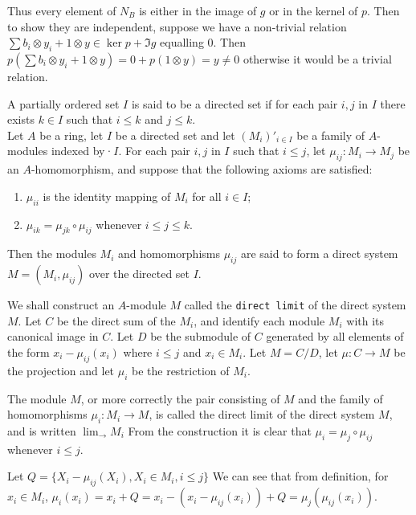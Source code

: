 \documentclass[a4paper]{exam}
\begin{document}
\begin{questions}
\begin{solution}
		Thus every element of $N_B $ is either in the image of $g $ or in the kernel of $p $.
		Then to show they are independent, suppose we have a non-trivial relation $\sum b_i \otimes y_i + 1 \otimes y \in \ker p + \Im g $ equalling 0.
		Then $p(\sum b_i \otimes y_i + 1 \otimes y) = 0 + p(1 \otimes y) = y \ne 0$ otherwise it would be a trivial relation.
	\end{solution}

	\question A partially ordered set $I$ is said to be a directed set if for each pair $i, j$ in $I$ there exists $k \in I$ such that $i\le k $ and $j\le k $.\\
	Let $A$ be a ring, let $I$ be a directed set and let $(M_i)'_{i\in I}$ be a family of $A$-modules indexed by·$I$. For each pair $i,j$ in $I$ such that $i \le j$, let $\mu _{ij}: M_i \to M_j $ be an $A$-homomorphism, and suppose that the following axioms are satisfied:
	\begin{enumerate}
		\item $\mu_{ii} $ is the identity mapping of $M_i$ for all $i\in I $;
		\item $\mu _{ik} = \mu _{jk}\circ \mu _{ij}$ whenever $i\le j \le k $.
	\end{enumerate}
	Then the modules $M_i$ and homomorphisms $\mu_{ij} $ are said to form a direct system $M = (M_i, \mu _{ij})$ over the directed set $I$.

	We shall construct an $A$-module $M$ called the \texttt{direct limit} of the direct system $M$. Let $C$ be the direct sum of the $M_i$, and identify each module $M_i$ with its canonical image in $C$. Let $D$ be the submodule of $C$ generated by all elements of the form $x_i - \mu _{ij}(x_i) $ where $i\le j $ and $x_i\in M_i $. Let $M = C / D $, let $\mu :C\to M $ be the projection and let $\mu _i $ be the restriction of $M_i $.

	The module $M$, or more correctly the pair consisting of $M$ and the family of homomorphisms $\mu _i:M_i \to M $, is called the direct limit of the direct system $M$, and is written $\lim_{\rightarrow} M_i $ From the construction it is clear that $\mu _i = \mu _j \circ \mu _{ij} $ whenever $i\le j $.
	\begin{solution}
		Let $Q = \{X_i - \mu _{ij}(X_i), X_i \in M_i, i\le j\}$
		We can see that from definition, for $x_i \in M_i $, $\mu _i(x_i) = x_i + Q = x_i - (x_i - \mu_{ij}(x_i)) + Q = \mu_j(\mu_{ij}(x_i))$.
	\end{solution}


\end{questions}
\end{document}
